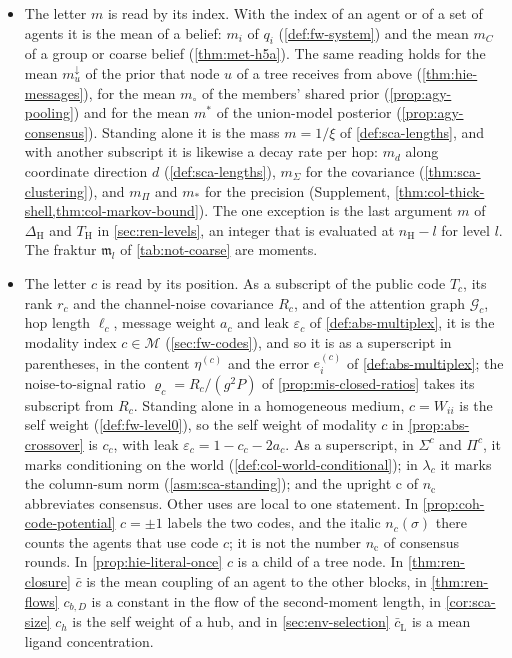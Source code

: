 \begin{itemize}
\item The letter $m$ is read by its index. With the index of an agent or of a set of agents it is the mean of a belief: $m_i$ of $q_i$ (\cref{def:fw-system}) and the mean $m_C$ of a group or coarse belief (\cref{thm:met-h5a}). The same reading holds for the mean $m^\downarrow_u$ of the prior that node $u$ of a tree receives from above (\cref{thm:hie-messages}), for the mean $m_\circ$ of the members' shared prior (\cref{prop:agy-pooling}) and for the mean $m^\ast$ of the union-model posterior (\cref{prop:agy-consensus}). Standing alone it is the mass $m=1/\xi$ of \cref{def:sca-lengths}, and with another subscript it is likewise a decay rate per hop: $m_d$ along coordinate direction $d$ (\cref{def:sca-lengths}), $m_\Sigma$ for the covariance (\cref{thm:sca-clustering}), and $m_\Pi$ and $m_\ast$ for the precision (Supplement, \cref{thm:col-thick-shell,thm:col-markov-bound}). The one exception is the last argument $m$ of $\Delta_{\mathrm H}$ and $T_{\mathrm H}$ in \cref{sec:ren-levels}, an integer that is evaluated at $n_{\mathrm H}-l$ for level $l$. The fraktur $\mathfrak m_l$ of \cref{tab:not-coarse} are moments.
\item The letter $c$ is read by its position. As a subscript of the public code $T_c$, its rank $r_c$ and the channel-noise covariance $R_c$, and of the attention graph $\mathcal G_c$, hop length $\ell_c$, message weight $a_c$ and leak $\varepsilon_c$ of \cref{def:abs-multiplex}, it is the modality index $c\in\mathcal M$ (\cref{sec:fw-codes}), and so it is as a superscript in parentheses, in the content $\eta^{(c)}$ and the error $e^{(c)}_i$ of \cref{def:abs-multiplex}; the noise-to-signal ratio $\varrho_c=R_c/(g^2P)$ of \cref{prop:mis-closed-ratios} takes its subscript from $R_c$. Standing alone in a homogeneous medium, $c=W_{ii}$ is the self weight (\cref{def:fw-level0}), so the self weight of modality $c$ in \cref{prop:abs-crossover} is $c_c$, with leak $\varepsilon_c=1-c_c-2a_c$. As a superscript, in $\Sigma^c$ and $\Pi^c$, it marks conditioning on the world (\cref{def:col-world-conditional}); in $\lambda_c$ it marks the column-sum norm (\cref{asm:sca-standing}); and the upright $\mathrm c$ of $n_{\mathrm c}$ abbreviates consensus. Other uses are local to one statement. In \cref{prop:coh-code-potential} $c=\pm1$ labels the two codes, and the italic $n_c(\sigma)$ there counts the agents that use code $c$; it is not the number $n_{\mathrm c}$ of consensus rounds. In \cref{prop:hie-literal-once} $c$ is a child of a tree node. In \cref{thm:ren-closure} $\bar c$ is the mean coupling of an agent to the other blocks, in \cref{thm:ren-flows} $c_{b,D}$ is a constant in the flow of the second-moment length, in \cref{cor:sca-size} $c_h$ is the self weight of a hub, and in \cref{sec:env-selection} $\bar c_{\mathrm L}$ is a mean ligand concentration.

\end{itemize}
